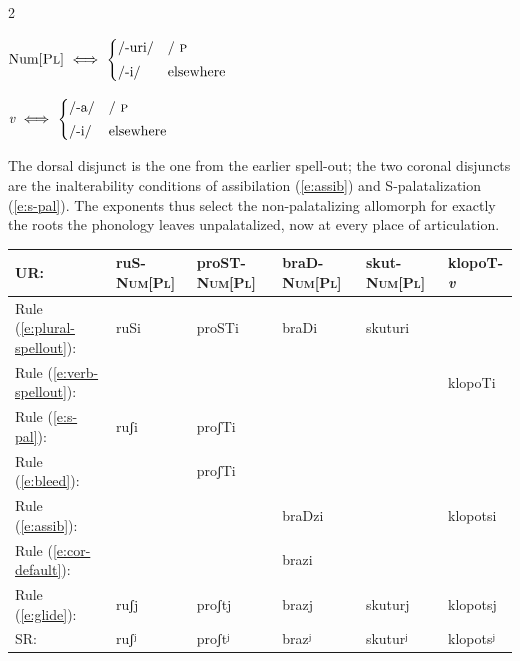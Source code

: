 \documentclass[11pt,letterpaper]{article}
\newcommand{\word}[1]{\textit{#1}}
\newcommand{\feature}[1]{\textsc{#1}}
\begin{document}
\begin{multicols}{2}
\begin{unlabeledexample}
$\text{Num}[\feature{Pl}]~
\Longleftrightarrow~
\begin{cases}
\textrm{/-uri/} & /~
\textsc{p} \\[3pt]
\textrm{/-i/} & 
\textrm{elsewhere}
\end{cases}$
\label{e:plural-spellout}
\end{unlabeledexample}

\begin{unlabeledexample}
$\word{v}~\Longleftrightarrow~
\begin{cases}
\textrm{/-a/} & /~\textsc{p} \\[3pt]
\textrm{/-i/} & \textrm{elsewhere}
\end{cases}$
\label{e:verb-spellout}
\end{unlabeledexample}
\end{multicols}

\noindent
The dorsal disjunct is the one from the earlier spell-out; the two coronal disjuncts are the inalterability conditions of assibilation (\ref{e:assib}) and S-palatalization (\ref{e:s-pal}).
The exponents thus select the non-palatalizing allomorph for exactly the roots the phonology leaves unpalatalized, now at every place of articulation.

\begin{unlabeledexample}
\begin{tabular}{l lllll}
UR: & ruS-\feature{Num}[\feature{Pl}]
    & proST-\feature{Num}[\feature{Pl}]
    & braD-\feature{Num}[\feature{Pl}]
    & skut-\feature{Num}[\feature{Pl}]
    & klopoT-\word{v} \\
\midrule
Rule (\ref{e:plural-spellout}):  & ruSi  & proSTi  & braDi  & skuturi  &          \\
Rule (\ref{e:verb-spellout}):    &       &         &        &          & klopoTi  \\
Rule (\ref{e:s-pal}):            & ruʃi  & proʃTi  &        &          &          \\
Rule (\ref{e:bleed}):            &       & proʃTi  &        &          &          \\
Rule (\ref{e:assib}):            &       &         & braDzi &          & klopotsi \\
Rule (\ref{e:cor-default}):      &       &         & brazi  &          &          \\
Rule (\ref{e:glide}):            & ruʃj  & proʃtj  & brazj  & skuturj  & klopotsj \\
\midrule
SR: & ruʃʲ & proʃtʲ & brazʲ & skuturʲ & klopotsʲ \\
\end{tabular}
\label{e:coronal-derivation}
\end{unlabeledexample}
\end{document}
